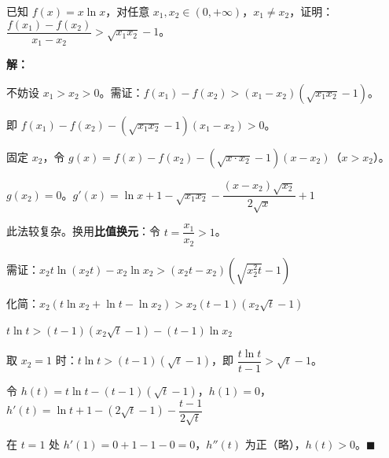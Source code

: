 \documentclass[12pt, a4paper]{ctexart}
\begin{document}
\begin{examplebox}
已知 $f(x)=x\ln x$，对任意 $x_1,x_2\in(0,+\infty)$，$x_1\neq x_2$，证明：$\dfrac{f(x_1)-f(x_2)}{x_1-x_2} > \sqrt{x_1 x_2} - 1$。

\textbf{解：}

不妨设 $x_1>x_2>0$。需证：$f(x_1)-f(x_2)>(x_1-x_2)(\sqrt{x_1 x_2}-1)$。

即 $f(x_1)-f(x_2)-(\sqrt{x_1 x_2}-1)(x_1-x_2)>0$。

固定 $x_2$，令 $g(x)=f(x)-f(x_2)-(\sqrt{x\cdot x_2}-1)(x-x_2)$（$x>x_2$）。

$g(x_2)=0$。$g'(x)=\ln x+1-\sqrt{x_1 x_2}-\dfrac{(x-x_2)\sqrt{x_2}}{2\sqrt{x}}+1$

此法较复杂。换用\textbf{比值换元}：令 $t=\dfrac{x_1}{x_2}>1$。

需证：$x_2 t\ln(x_2 t)-x_2\ln x_2>(x_2 t-x_2)(\sqrt{x_2^2 t}-1)$

化简：$x_2(t\ln x_2+\ln t-\ln x_2)>x_2(t-1)(x_2\sqrt{t}-1)$

$t\ln t>(t-1)(x_2\sqrt{t}-1)-(t-1)\ln x_2$

取 $x_2=1$ 时：$t\ln t>(t-1)(\sqrt{t}-1)$，即 $\dfrac{t\ln t}{t-1}>\sqrt{t}-1$。

令 $h(t)=t\ln t-(t-1)(\sqrt{t}-1)$，$h(1)=0$，$h'(t)=\ln t+1-(2\sqrt{t}-1)-\dfrac{t-1}{2\sqrt{t}}$

在 $t=1$ 处 $h'(1)=0+1-1-0=0$，$h''(t)$ 为正（略），$h(t)>0$。$\blacksquare$
\end{examplebox}
\end{document}
